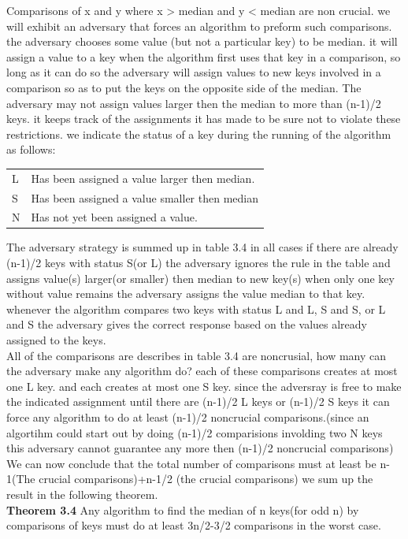\documentclass[a4paper,10pt,titlepage]{report}
\begin{document}
Comparisons of x and y where x > median and y < median are non crucial. we will exhibit an adversary that forces an algorithm to preform such comparisons. the adversary chooses some value (but not a particular key) to be median. it will assign a value to a key when the algorithm first uses that key in a comparison, so long as it can do so the adversary will assign values to new keys involved in a comparison so as to put the keys on the opposite side of the median. The adversary may not assign values larger then the median to more than (n-1)/2 keys. it keeps track of the assignments it has made to be sure not to violate these restrictions. we indicate the status of a key during the running of the algorithm as follows:\\
\begin{tabular}{ll}
L & Has been assigned a value larger then median. \\
S & Has been assigned a value smaller then median \\
N & Has not yet been assigned a value.
\end{tabular}
\vspace{5mm}
The adversary strategy is summed up in table 3.4 in all cases if there are already (n-1)/2 keys with status S(or L) the adversary ignores the rule in the table and assigns value(s) larger(or smaller) then median to new key(s) when only one key without value remains the adversary assigns the value median to that key. whenever the algorithm compares two keys with status L and L, S and S, or L and S the adversary gives the correct response based on the values already assigned to the keys.\\
All of the comparisons are describes in table 3.4 are noncrusial, how many can the adversary make any algorithm do? each of these comparisons creates at most one L key. and each creates at most one S key. since the adversray is free to make the indicated assignment until there are (n-1)/2 L keys or (n-1)/2 S keys it can force any algorithm to do at least (n-1)/2 noncrucial comparisons.(since an algortihm could start out by doing (n-1)/2 comparisions involding two N keys this adversary cannot guarantee any more then (n-1)/2 noncrucial comparisons)
We can now conclude that the total number of comparisons must at least be n-1(The crucial comparisons)+n-1/2 (the crucial comparisons) we sum up the result in the following theorem.\\
\vspace{5mm}
\textbf{Theorem 3.4} Any algorithm to find the median of n keys(for odd n) by comparisons of keys must do at least 3n/2-3/2 comparisons in the worst case.\\
\end{document}
